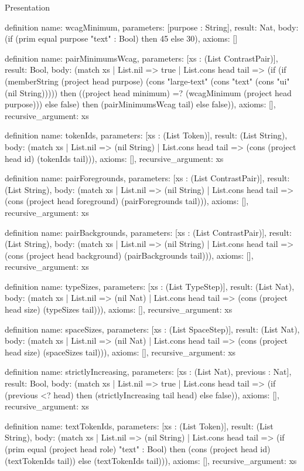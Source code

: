 \begin{lexlean}{Presentation}
\begin{semanticmodule}
definition{
  name: wcagMinimum,
  parameters: [purpose : String],
  result: Nat,
  body: (if (prim equal purpose "text" : Bool) then 45 else 30),
  axioms: []
}

definition{
  name: pairMinimumsWcag,
  parameters: [xs : (List ContrastPair)],
  result: Bool,
  body: (match xs
    | List.nil => true
    | List.cons head tail => (if (if (memberString (project head purpose) (cons "large-text" (cons "text" (cons "ui" (nil String))))) then ((project head minimum) =? (wcagMinimum (project head purpose))) else false) then (pairMinimumsWcag tail) else false)),
  axioms: [],
  recursive_argument: xs
}

definition{
  name: tokenIds,
  parameters: [xs : (List Token)],
  result: (List String),
  body: (match xs
    | List.nil => (nil String)
    | List.cons head tail => (cons (project head id) (tokenIds tail))),
  axioms: [],
  recursive_argument: xs
}

definition{
  name: pairForegrounds,
  parameters: [xs : (List ContrastPair)],
  result: (List String),
  body: (match xs
    | List.nil => (nil String)
    | List.cons head tail => (cons (project head foreground) (pairForegrounds tail))),
  axioms: [],
  recursive_argument: xs
}

definition{
  name: pairBackgrounds,
  parameters: [xs : (List ContrastPair)],
  result: (List String),
  body: (match xs
    | List.nil => (nil String)
    | List.cons head tail => (cons (project head background) (pairBackgrounds tail))),
  axioms: [],
  recursive_argument: xs
}

definition{
  name: typeSizes,
  parameters: [xs : (List TypeStep)],
  result: (List Nat),
  body: (match xs
    | List.nil => (nil Nat)
    | List.cons head tail => (cons (project head size) (typeSizes tail))),
  axioms: [],
  recursive_argument: xs
}

definition{
  name: spaceSizes,
  parameters: [xs : (List SpaceStep)],
  result: (List Nat),
  body: (match xs
    | List.nil => (nil Nat)
    | List.cons head tail => (cons (project head size) (spaceSizes tail))),
  axioms: [],
  recursive_argument: xs
}

definition{
  name: strictlyIncreasing,
  parameters: [xs : (List Nat), previous : Nat],
  result: Bool,
  body: (match xs
    | List.nil => true
    | List.cons head tail => (if (previous <? head) then (strictlyIncreasing tail head) else false)),
  axioms: [],
  recursive_argument: xs
}

definition{
  name: textTokenIds,
  parameters: [xs : (List Token)],
  result: (List String),
  body: (match xs
    | List.nil => (nil String)
    | List.cons head tail => (if (prim equal (project head role) "text" : Bool) then (cons (project head id) (textTokenIds tail)) else (textTokenIds tail))),
  axioms: [],
  recursive_argument: xs
}


\end{semanticmodule}
\end{lexlean}
